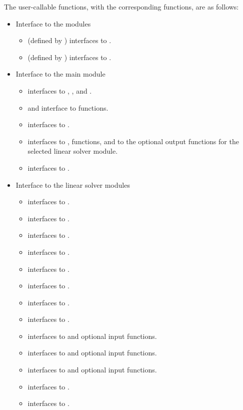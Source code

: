 The user-callable functions, with the corresponding {\kinsol} functions,
are as follows:
\begin{itemize}
\item
  Interface to the {\nvector} modules
  \begin{itemize}
  \item {} (defined by {\nvecs}) 
    interfaces to .
  \item {} (defined by {\nvecp}) 
    interfaces to .
  \end{itemize}
\item Interface to the main {\kinsol} module
  \begin{itemize}
  \item {}
    interfaces to , , and .
  \item {} and 
    interface to  functions.
  \item {}
    interfaces to .
  \item {}
    interfaces to ,  functions, and to the optional
    output functions for the selected linear solver module.
  \item {}    
    interfaces to .
  \end{itemize}  
\item Interface to the linear solver modules
  \begin{itemize}
  \item {}
    interfaces to .
  \item {}
    interfaces to .
  \item {}
    interfaces to .
  \item {}
    interfaces to .
  \item {}
    interfaces to .
  \item {}
    interfaces to .
  \item {}
    interfaces to .
  \item {}
    interfaces to .
  \item {}
    interfaces to  and {\spgmr} optional input functions.
  \item {}
    interfaces to  and {\spbcg} optional input functions.
  \item {}
    interfaces to  and {\sptfqmr} optional input functions.
  \item {}
    interfaces to .
  \item {}
    interfaces to .
 \end{itemize}

\end{itemize}
